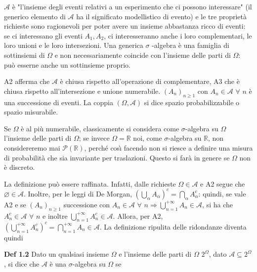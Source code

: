 \documentclass{article}
\begin{document}
$\mathcal{A}$ \`{e} "l'insieme degli eventi relativi a un esperimento che ci
possono interessare" (il generico elemento di $\mathcal{A}$ ha il
significato modellistico di evento) e le tre propriet\`{a} richieste sono
ragionevoli per poter avere un insieme abbastanza ricco di eventi: se ci
interessano gli eventi $A_{1},A_{2}$, ci interesseranno anche i loro
complementari, le loro unioni e le loro intersezioni. Una generica $\sigma $%
-algebra \`{e} una famiglia di sottinsiemi di $\Omega $ e non
necessariamente coincide con l'insieme delle parti di $\Omega $: pu\`{o}
esserne anche un sottinsieme proprio.

A2 afferma che $\mathcal{A}$ \`{e} chiusa rispetto all'operazione di
complementare, A3 che \`{e} chiusa rispetto all'intersezione e unione
numerabile. $\left( A_{n}\right) _{n\geq 1}$ con $A_{n}\in \mathcal{A}$ $%
\forall $ $n$ \`{e} una successione di eventi. La coppia $\left( \Omega ,%
\mathcal{A}\right) $ si dice spazio probabilizzabile o spazio misurabile.

Se $\Omega $ \`{e} al pi\`{u} numerabile, classicamente si considera come $%
\sigma $-algebra su $\Omega $ l'insieme delle parti di $\Omega $; se invece $%
\Omega =%
\mathbb{R}
$ noi, come $\sigma $-algebra su $%
\mathbb{R}
$, non considereremo mai $\mathcal{P}\left( 
\mathbb{R}
\right) $, perch\'{e} cos\`{\i} facendo non si riesce a definire una misura
di probabilit\`{a} che sia invariante per traslazioni. Questo si far\`{a}
in genere se $\Omega $ non \`{e} discreto.

La definizione pu\`{o} essere raffinata. Infatti, dalle richieste $\Omega
\in \mathcal{A}$ e A2 segue che $\varnothing \in \mathcal{A}$. Inoltre, per
le leggi di De Morgan, $\left( \bigcup_{\alpha }A_{\alpha }\right)
^{c}=\bigcap_{\alpha }A_{\alpha }^{c}$: quindi, se vale A2 e se $\left(
A_{n}\right) _{n\geq 1}$ successione con $A_{n}\in \mathcal{A}$ $\forall $ $%
n\Longrightarrow \bigcup_{n=1}^{+\infty }A_{n}\in \mathcal{A}$, si ha che $%
A_{n}^{c}\in \mathcal{A}$ $\forall $ $n$ e inoltre $\bigcup_{n=1}^{+\infty
}A_{n}^{c}\in \mathcal{A}$. Allora, per A2, $\left( \bigcup_{n=1}^{+\infty
}A_{n}^{c}\right) ^{c}=\bigcap_{n=1}^{+\infty }A_{n}\in \mathcal{A}$. La
definizione ripulita delle ridondanze diventa quindi

\textbf{Def 1.2} Dato un qualsiasi insieme $\Omega $ e l'insieme delle parti
di $\Omega $ $2^{\Omega }$, dato $\mathcal{A}\subseteq 2^{\Omega }$, si dice
che $\mathcal{A}$ \`{e} una $\sigma $-algebra su $\Omega $ se
\end{document}
